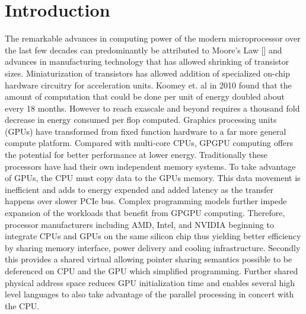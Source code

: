 \section{Introduction}
The remarkable advances in computing power of the modern microprocessor over the last few decades can predominantly be attributed to Moore's Law [] and advances in manufacturing technology that has allowed shrinking of transistor sizes. Miniaturization of transistors has allowed addition of specialized on-chip hardware circuitry for acceleration units. Koomey et. al in 2010 found that the amount of computation that could be done per unit of energy doubled about every 18 months. However to reach exascale and beyond requires a thousand fold decrease in energy consumed per flop computed. Graphics processing units (GPUs) have transformed from fixed function hardware to a far more general compute platform.  Compared with multi-core CPUs, GPGPU computing offers the potential for better performance at lower energy. Traditionally these processors have had their own independent memory systems. To take advantage of GPUs, the CPU must copy data to the GPUs memory. This data movement is inefficient and adds to energy expended and added latency as the transfer happens over slower PCIe bus. Complex programming models further impede expansion of the workloads that benefit from GPGPU computing. Therefore, processor manufacturers including AMD, Intel\cite{inteliris}, and NVIDIA beginning to integrate CPUs and GPUs on the same silicon chip thus yielding better efficiency by sharing memory interface, power delivery and cooling infrastructure. Secondly this provides a shared virtual allowing pointer sharing semantics possible to be deferenced on CPU and the GPU which simplified programming. Further shared physical address space reduces GPU initialization time and enables several high level languages to also take advantage of the parallel processing in concert with the CPU.\\

